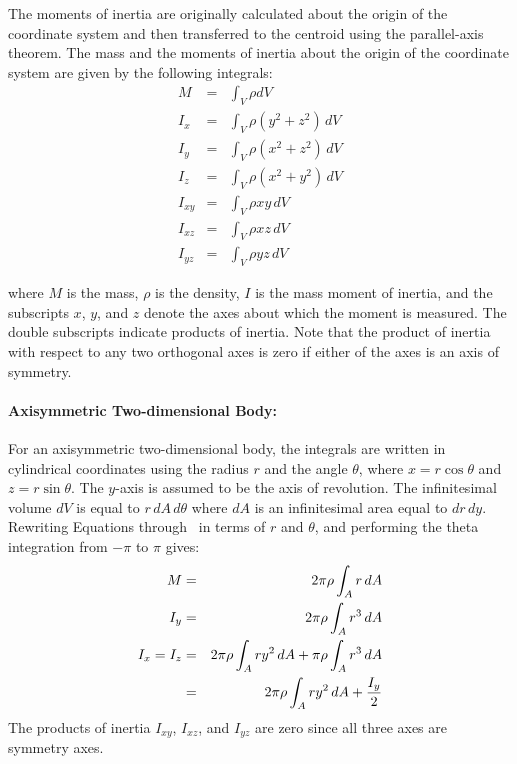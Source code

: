 The moments of inertia are originally calculated about the origin of the
coordinate system and then transferred to the centroid using the
parallel-axis theorem. The mass and the moments of inertia about the
origin of the coordinate system are given by the following integrals: 
\begin{eqnarray}
 M      &=& \int_V \rho dV                         \label{V}\\
 I_x    &=& \int_V \rho\left(y^2 + z^2\right)\,dV \label{IX}\\
 I_y    &=& \int_V \rho\left(x^2 + z^2\right)\,dV \label{IY}\\
 I_z    &=& \int_V \rho\left(x^2 + y^2\right)\,dV \label{IZ}\\
 I_{xy} &=& \int_V \rho xy\,dV                    \label{IXY}\\
 I_{xz} &=& \int_V \rho xz\,dV                    \label{IXZ}\\
 I_{yz} &=& \int_V \rho yz\,dV                    \label{IYZ}
\end{eqnarray}

where $M$ is the mass, $\rho$ is the density, $I$ is the mass moment
of inertia, and the subscripts $x$, $y$, and $z$ denote the axes about
which the moment is measured.  The double subscripts indicate products
of inertia.  Note that the product of inertia with respect to any two
orthogonal axes is zero if either of the axes is an axis of symmetry. 

\paragraph{Axisymmetric Two-dimensional Body:}
For an axisymmetric two-dimensional body, the integrals are written in
cylindrical coordinates using the radius $r$ and the angle $\theta$,
where $x = r\cos\theta$ and $z = r\sin\theta$.  The $y$-axis is assumed
to be the axis of revolution.  The infinitesimal volume $dV$ is equal to
$r\,dA\,d\theta$ where $dA$ is an infinitesimal area equal to $dr\,dy$.
Rewriting Equations  through~ in terms of
$r$ and $\theta$, and performing the theta integration from $-\pi$ to
$\pi$ gives: 
\begin{eqnarray}
M   &=& 2\pi\rho\int_A r\,dA   \\
I_y &=& 2\pi\rho\int_A r^3\,dA   \\
I_x = I_z &=& 2\pi\rho\int_A r y^2\,dA + \pi\rho \int_A r^3\,dA\nonumber \\
    &=& 2\pi\rho\int_A r y^2\,dA + {I_y\over2}  
\end{eqnarray}
The products of inertia $I_{xy}$, $I_{xz}$, and $I_{yz}$ are zero since
all three axes are symmetry axes.  

